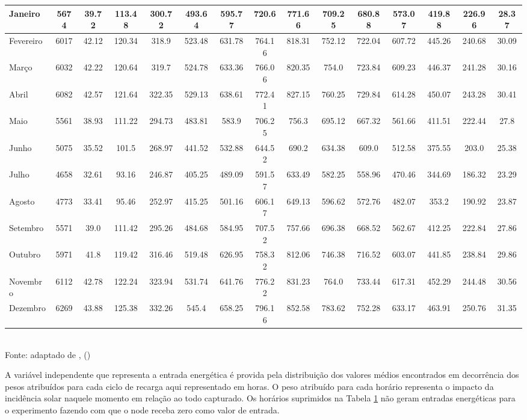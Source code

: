 \begin{table}[h]
\begin{tabular}{l c | *{13}{c} }
	\hline
	Janeiro & 5674 & 39.72 & 113.48 & 300.72 & 493.64 & 595.77 & 720.6 & 771.66 & 709.25 & 680.88 & 573.07 & 419.88 & 226.96 & 28.37 \\
	\hline
	Fevereiro & 6017 & 42.12 & 120.34 & 318.9 & 523.48 & 631.78 & 764.16 & 818.31 & 752.12 & 722.04 & 607.72 & 445.26 & 240.68 & 30.09\\
	\hline
	Março & 6032 &  42.22 & 120.64 & 319.7 & 524.78 & 633.36 & 766.06 & 820.35 & 754.0 & 723.84 & 609.23 & 446.37 & 241.28 & 30.16\\
	\hline
	Abril & 6082 & 42.57 & 121.64 & 322.35 & 529.13 & 638.61 & 772.41 & 827.15 & 760.25 & 729.84 & 614.28 & 450.07 & 243.28 & 30.41 \\
	\hline
	Maio & 5561 & 38.93 & 111.22 & 294.73 & 483.81 & 583.9 & 706.25 & 756.3 & 695.12 & 667.32 & 561.66 & 411.51 & 222.44 & 27.8 \\
	\hline
	Junho & 5075 & 35.52 & 101.5 & 268.97 & 441.52 & 532.88 & 644.52 & 690.2 & 634.38 & 609.0 & 512.58 & 375.55 & 203.0 & 25.38 \\
	\hline
	Julho & 4658 & 32.61 & 93.16 & 246.87 & 405.25 & 489.09 & 591.57 & 633.49 & 582.25 & 558.96 & 470.46 & 344.69 & 186.32 & 23.29 \\
	\hline
	Agosto & 4773 & 33.41 & 95.46 & 252.97 & 415.25 & 501.16 & 606.17 & 649.13 & 596.62 & 572.76 & 482.07 & 353.2 & 190.92 & 23.87 \\
	\hline
	Setembro & 5571 & 39.0 & 111.42 & 295.26 & 484.68 & 584.95 & 707.52 & 757.66 & 696.38 & 668.52 & 562.67 & 412.25 & 222.84 & 27.86 \\
	\hline
	Outubro & 5971 & 41.8 & 119.42 & 316.46 & 519.48 & 626.95 & 758.32 & 812.06 & 746.38 & 716.52 & 603.07 & 441.85 & 238.84 & 29.86 \\
	\hline
	Novembro & 6112 & 42.78 & 122.24 & 323.94 & 531.74 & 641.76 & 776.22 & 831.23 & 764.0 & 733.44 & 617.31 & 452.29 & 244.48 & 30.56 \\
	\hline
	Dezembro & 6269 & 43.88 & 125.38 & 332.26 & 545.4 & 658.25 & 796.16 & 852.58 & 783.62 & 752.28 & 633.17 & 463.91 & 250.76 & 31.35 \\
\bottomrule
\end{tabular}
\label{table:cap6distribuicaonatal}
\\
\footnotesize Fonte: adaptado de \citeauthor{martins2017atlas}, (\citeyear{martins2017atlas})

\end{table}
\endgroup

A variável independente que representa a entrada energética é provida pela distribuição dos valores médios encontrados em decorrência dos pesos atribuídos para cada ciclo de recarga aqui representado em horas. O peso atribuído para cada horário representa o impacto da incidência solar naquele momento em relação ao todo capturado. Os horários suprimidos na Tabela \ref{table:cap6distribuicaonatal} não geram entradas energéticas para o experimento fazendo com que o node receba zero como valor de entrada.

